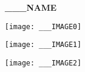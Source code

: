 %
%
%
%

\begin{center} 
  \vspace*{\fill}
  \Huge{\textbf{___NAME}}
  \vspace*{\fill}
\end{center}
\newpage


\begin{center}
{}
\texttt{[image: \_\_\_IMAGE0]} %
\newpage

\texttt{[image: \_\_\_IMAGE1]} %
\newpage

\texttt{[image: \_\_\_IMAGE2]} %


\end{center}

\newpage

\chead{}



